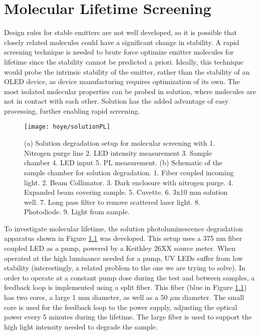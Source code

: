 \documentclass[../thesis.tex]{subfiles}
\begin{document}
\chapter{Molecular Lifetime Screening}\label{sec:hoye_solutionPL}
Design rules for stable emitters are not well developed, so it is possible that closely related molecules could have a significant change in stability.
A rapid screening technique is needed to brute force optimize emitter molecules for lifetime since the stability cannot be predicted a priori.
Ideally, this technique would probe the intrinsic stability of the emitter, rather than the stability of an OLED device, as device manufacturing requires optimization of its own.
The most isolated molecular properties can be probed in solution, where molecules are not in contact with each other.
Solution has the added advantage of easy processing, further enabling rapid screening.

\begin{figure}[ht]
\centering
\texttt{[image: hoye/solutionPL]}
\caption{(a) Solution degradation setup for molecular screening with 1. Nitrogen purge line 2. LED intensity measurement 3. Sample chamber 4. LED input 5. PL measurement. (b) Schematic of the sample chamber for solution degradation.  1. Fiber coupled incoming light. 2. Beam Collimator. 3. Dark enclosure with nitrogen purge. 4. Expanded beam covering sample. 5. Cuvette. 6. 3x10 mm solution well. 7. Long pass filter to remove scattered laser light. 8. Photodiode. 9. Light from sample.}
\label{fig:hoye_solutionPL}
\end{figure}

To investigate molecular lifetime, the solution photoluminescence degradation apparatus shown in Figure \ref{fig:hoye_solutionPL} was developed.
This setup uses a 375 nm fiber coupled LED as a pump, powered by a Keithley 26XX source meter.
When operated at the high luminance needed for a pump, UV LEDs suffer from low stability (interestingly, a related problem to the one we are trying to solve).
In order to operate at a constant pump dose during the test and between samples, a feedback loop is implemented using a split fiber.  
This fiber (blue in Figure \ref{fig:hoye_solutionPL}) has two cores, a large 1 mm diameter, as well as a 50 $\mu$m diameter.
The small core is used for the feedback loop to the power supply, adjusting the optical power every 5 minutes during the lifetime.
The large fiber is used to support the high light intensity needed to degrade the sample.
\end{document}
